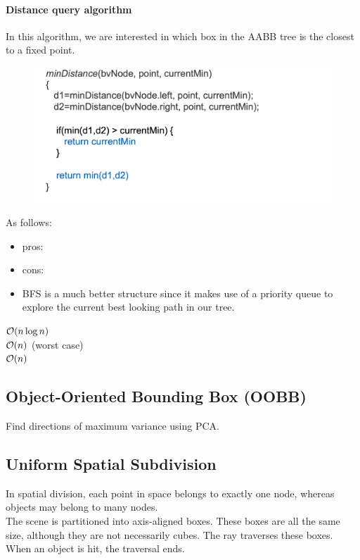 \documentclass[11pt]{article}
\numberwithin{equation}{section}
\begin{document}
\paragraph{Distance query algorithm}
In this algorithm, we are interested in which box in the AABB tree is the closest to a fixed point.
	\begin{figure}[H]
	\centering
	\includegraphics[scale=0.4]{p10}
	\end{figure}
As follows:
\begin{itemize}
	\item pros: 
	\item cons: 
	\item BFS is a much better structure since it makes use of a priority queue to explore the current best looking path in our tree.
\end{itemize}
\remark
{} $\mathcal{O}(n\log n)$\\
 $\mathcal{O}(n)$ (worst case) \\
 $\mathcal{O}(n)$




\subsection{Object-Oriented Bounding Box (OOBB)}
Find directions of maximum variance using PCA.


\subsection{Uniform Spatial Subdivision}
In spatial division, each point in space belongs to exactly one node, whereas objects may belong to many nodes.\\
The scene is partitioned into axis-aligned boxes. These boxes are all the same size, although they are not necessarily cubes. The ray traverses these boxes. When an object is hit, the traversal ends.
\end{document}
